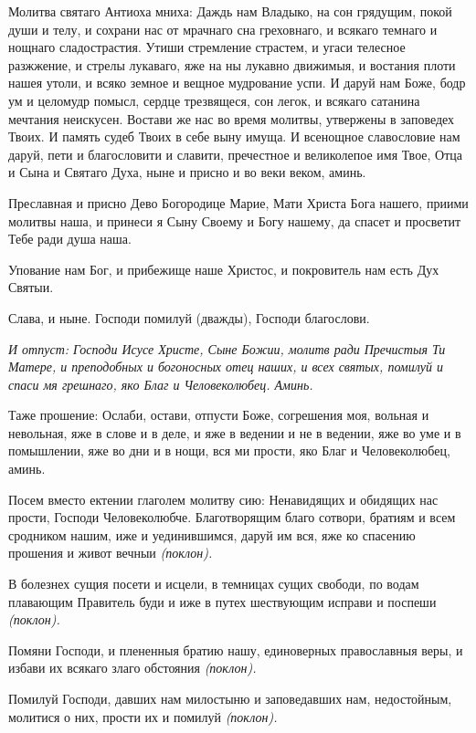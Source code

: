 Молитва святаго Антиоха мниха: Даждь нам Владыко, на сон грядущим, покой души и телу, и сохрани нас от мрачнаго сна греховнаго, и всякаго темнаго и нощнаго сладострастия. Утиши стремление страстем, и угаси телесное разжжение, и стрелы лукаваго, яже на ны лукавно движимыя, и востания плоти нашея утоли, и всяко земное и вещное мудрование успи. И даруй нам Боже, бодр ум и целомудр помысл, сердце трезвящеся, сон легок, и всякаго сатанина мечтания неискусен. Востави же нас во время молитвы, утвержены в заповедех Твоих. И память судеб Твоих в себе выну имуща. И всенощное славословие нам даруй, пети и благословити и славити, пречестное и великолепое имя Твое, Отца и Сына и Святаго Духа, ныне и присно и во веки веком, аминь.


Преславная и присно Дево Богородице Марие, Мати Христа Бога нашего, приими молитвы наша, и принеси я Сыну Своему и Богу нашему, да спасет и просветит Тебе ради душа наша.


Упование нам Бог, и прибежище наше Христос, и покровитель нам есть Дух Святыи.


Слава, и ныне. Господи помилуй (дважды), Господи благослови.


\itshape И отпуст:\normalfont{} Господи Исусе Христе, Сыне Божии, молитв ради Пречистыя Ти Матере, и преподобных и богоносных отец наших, и всех святых, помилуй и спаси мя грешнаго, яко Благ и Человеколюбец. Аминь.


Таже прошение: Ослаби, остави, отпусти Боже, согрешения моя, вольная и невольная, яже в слове и в деле, и яже в ведении и не в ведении, яже во уме и в помышлении, яже во дни и в нощи, вся ми прости, яко Благ и Человеколюбец, аминь.


Посем вместо ектении глаголем молитву сию: Ненавидящих и обидящих нас прости, Господи Человеколюбче. Благотворящим благо сотвори, братиям и всем сродником нашим, иже и уединившимся, даруй им вся, яже ко спасению прошения и живот вечныи \itshape (поклон)\normalfont{}.


В болезнех сущия посети и исцели, в темницах сущих свободи, по водам плавающим Правитель буди и иже в путех шествующим исправи и поспеши \itshape (поклон)\normalfont{}.


Помяни Господи, и плененныя братию нашу, единоверных православныя веры, и избави их всякаго злаго обстояния \itshape (поклон)\normalfont{}.


Помилуй Господи, давших нам милостыню и заповедавших нам, недостойным, молитися о них, прости их и помилуй \itshape (поклон)\normalfont{}.


